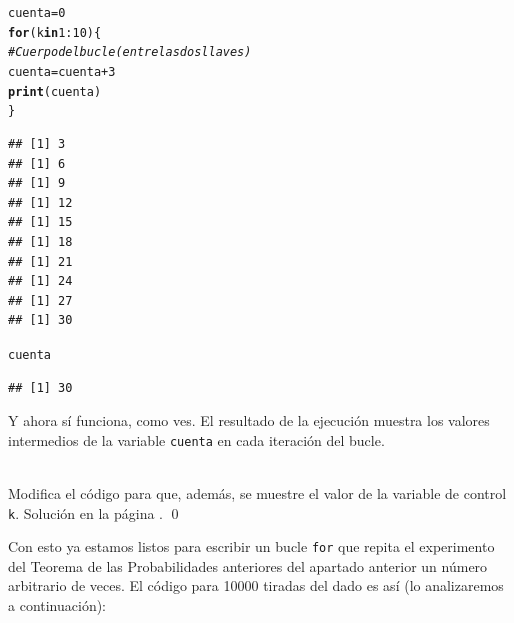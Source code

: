 \documentclass[10pt,a4paper]{article}\usepackage[]{graphicx}\usepackage[]{color}
\makeatletter
\newcommand{\hlnum}[1]{\textcolor[rgb]{0.686,0.059,0.569}{#1}}%
\newcommand{\hlcom}[1]{\textcolor[rgb]{0.678,0.584,0.686}{\textit{#1}}}%
\newcommand{\hlopt}[1]{\textcolor[rgb]{0,0,0}{#1}}%
\newcommand{\hlstd}[1]{\textcolor[rgb]{0.345,0.345,0.345}{#1}}%
\newcommand{\hlkwa}[1]{\textcolor[rgb]{0.161,0.373,0.58}{\textbf{#1}}}%
\newcommand{\hlkwb}[1]{\textcolor[rgb]{0.69,0.353,0.396}{#1}}%
\newcommand{\hlkwd}[1]{\textcolor[rgb]{0.737,0.353,0.396}{\textbf{#1}}}%
\newenvironment{kframe}{%
 \def\at@end@of@kframe{}%
 \ifinner\ifhmode%
  \def\at@end@of@kframe{\end{minipage}}%
  \begin{minipage}{\columnwidth}%
 \fi\fi%
 \def\FrameCommand##1{\hskip\@totalleftmargin \hskip-\fboxsep
 \colorbox{shadecolor}{##1}\hskip-\fboxsep
     \hskip-\linewidth \hskip-\@totalleftmargin \hskip\columnwidth}%
 \MakeFramed {\advance\hsize-\width
   \@totalleftmargin\z@ \linewidth\hsize
   \@setminipage}}%
 {\par\unskip\endMakeFramed%
 \at@end@of@kframe}
\newenvironment{knitrout}{}{} %
\newcounter {cont01}
\makeatother
\begin{document}
\begin{knitrout}
\color{fgcolor}\begin{kframe}
\begin{alltt}
    \hlstd{cuenta}\hlkwb{=}\hlnum{0}
    \hlkwa{for}\hlstd{(k} \hlkwa{in} \hlnum{1}\hlopt{:}\hlnum{10}\hlstd{)\{}
        \hlcom{# Cuerpo del bucle (entre las dos llaves)}
        \hlstd{cuenta} \hlkwb{=} \hlstd{cuenta} \hlopt{+} \hlnum{3}
        \hlkwd{print}\hlstd{(cuenta)}
    \hlstd{\}}
\end{alltt}
\begin{verbatim}
## [1] 3
## [1] 6
## [1] 9
## [1] 12
## [1] 15
## [1] 18
## [1] 21
## [1] 24
## [1] 27
## [1] 30
\end{verbatim}
\begin{alltt}
    \hlstd{cuenta}
\end{alltt}
\begin{verbatim}
## [1] 30
\end{verbatim}
\end{kframe}
\end{knitrout}
Y ahora sí funciona, como ves. El resultado de la ejecución muestra los valores intermedios de la variable {\tt cuenta} en cada iteración del bucle.

\begin{ejercicio}
\label{tut04:ejercicio09}
\quad\\
Modifica el código para que, además, se muestre el valor de la variable de control {\tt k}.
Solución en la página \pageref{tut04:ejercicio09:sol}.
\qed
\end{ejercicio}

Con esto ya estamos listos para escribir un bucle {\tt for} que repita el experimento del Teorema de las Probabilidades anteriores del apartado anterior un número arbitrario de veces. El código para 10000 tiradas del dado es así (lo analizaremos a continuación):
\end{document}
